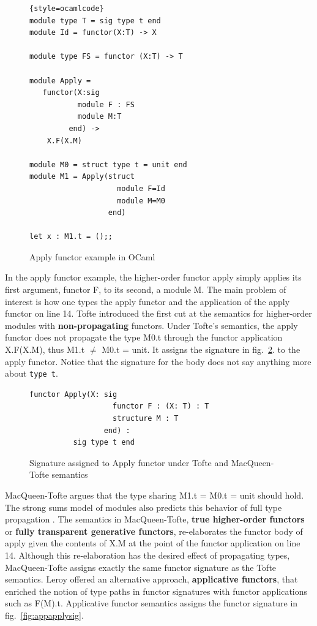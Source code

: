 \documentclass[12pt]{article}
\begin{document}
\begin{figure}
\begin{lstlisting}{style=ocamlcode}
module type T = sig type t end
module Id = functor(X:T) -> X

module type FS = functor (X:T) -> T

module Apply = 
   functor(X:sig
	       module F : FS
	       module M:T 
	     end) -> 
	X.F(X.M)

module M0 = struct type t = unit end	
module M1 = Apply(struct 
                    module F=Id 
                    module M=M0 
	              end)

let x : M1.t = ();;
\end{lstlisting}
\caption{Apply functor example in OCaml}
\label{fig:applyfctocaml}
\end{figure}
		
In the apply functor example, the higher-order functor apply simply applies its first argument, functor F, to its second, a module M. The main problem of interest is how one types the apply functor and the application of the apply functor on line 14. Tofte\cite{tofte92} introduced the first cut at the semantics for higher-order modules with {\bf non-propagating} functors. Under Tofte's semantics, the apply functor does not propagate the type M0.t through the functor application X.F(X.M), thus M1.t $\ne$ M0.t = unit. It assigns the signature in fig.~\ref{fig:tofteapplysig}. to the apply functor. Notice that the signature for the body does not say anything more about \lstinline{type t}. 
\begin{figure}
\begin{lstlisting}
functor Apply(X: sig
                   functor F : (X: T) : T
                   structure M : T
                 end) :
	      sig type t end
\end{lstlisting}
\caption{Signature assigned to Apply functor under Tofte and MacQueen-Tofte semantics}
\label{fig:tofteapplysig}
\end{figure}

MacQueen-Tofte\cite{mt94} argues that the type sharing M1.t = M0.t = unit should hold. The strong sums model of modules also predicts this behavior of full type propagation \cite{macqueen:popl86}. The semantics in MacQueen-Tofte, {\bf true higher-order functors} or {\bf fully transparent generative functors}, re-elaborates the functor body of apply given the contents of X.M at the point of the functor application on line 14. Although this re-elaboration has the desired effect of propagating types, MacQueen-Tofte assigns exactly the same functor signature as the Tofte semantics. Leroy\cite{leroy95} offered an alternative approach, {\bf applicative functors}, that enriched the notion of type paths in functor signatures with functor applications such as F(M).t. Applicative functor semantics assigns the functor signature in fig.~\ref{fig:appapplysig}. 
\end{document}
